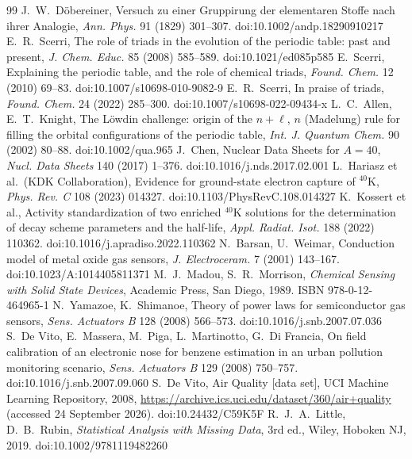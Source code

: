 \documentclass[11pt]{article}
\theoremstyle{definition}\newtheorem{definition}[theorem]{Definition}
\theoremstyle{remark}\newtheorem{remark}[theorem]{Remark}
\begin{document}
\begin{thebibliography}{99}\small
{} J.~W.~D\"obereiner, Versuch zu einer Gruppirung der elementaren Stoffe nach ihrer Analogie, \emph{Ann. Phys.} 91 (1829) 301--307. doi:10.1002/andp.18290910217
 E.~R.~Scerri, The role of triads in the evolution of the periodic table: past and present, \emph{J. Chem. Educ.} 85 (2008) 585--589. doi:10.1021/ed085p585
 E.~Scerri, Explaining the periodic table, and the role of chemical triads, \emph{Found. Chem.} 12 (2010) 69--83. doi:10.1007/s10698-010-9082-9
 E.~R.~Scerri, In praise of triads, \emph{Found. Chem.} 24 (2022) 285--300. doi:10.1007/s10698-022-09434-x
 L.~C.~Allen, E.~T.~Knight, The L\"owdin challenge: origin of the $n+\ell$, $n$ (Madelung) rule for filling the orbital configurations of the periodic table, \emph{Int. J. Quantum Chem.} 90 (2002) 80--88. doi:10.1002/qua.965
 J.~Chen, Nuclear Data Sheets for $A=40$, \emph{Nucl. Data Sheets} 140 (2017) 1--376. doi:10.1016/j.nds.2017.02.001
 L.~Hariasz et al.\ (KDK Collaboration), Evidence for ground-state electron capture of ${}^{40}$K, \emph{Phys. Rev. C} 108 (2023) 014327. doi:10.1103/PhysRevC.108.014327
 K.~Kossert et al., Activity standardization of two enriched ${}^{40}$K solutions for the determination of decay scheme parameters and the half-life, \emph{Appl. Radiat. Isot.} 188 (2022) 110362. doi:10.1016/j.apradiso.2022.110362
 N.~Barsan, U.~Weimar, Conduction model of metal oxide gas sensors, \emph{J. Electroceram.} 7 (2001) 143--167. doi:10.1023/A:1014405811371
 M.~J.~Madou, S.~R.~Morrison, \emph{Chemical Sensing with Solid State Devices}, Academic Press, San Diego, 1989. ISBN 978-0-12-464965-1
 N.~Yamazoe, K.~Shimanoe, Theory of power laws for semiconductor gas sensors, \emph{Sens. Actuators B} 128 (2008) 566--573. doi:10.1016/j.snb.2007.07.036
 S.~De Vito, E.~Massera, M.~Piga, L.~Martinotto, G.~Di Francia, On field calibration of an electronic nose for benzene estimation in an urban pollution monitoring scenario, \emph{Sens. Actuators B} 129 (2008) 750--757. doi:10.1016/j.snb.2007.09.060
 S.~De Vito, Air Quality [data set], UCI Machine Learning Repository, 2008, \url{https://archive.ics.uci.edu/dataset/360/air+quality} (accessed 24 September 2026). doi:10.24432/C59K5F
 R.~J.~A.~Little, D.~B.~Rubin, \emph{Statistical Analysis with Missing Data}, 3rd ed., Wiley, Hoboken NJ, 2019. doi:10.1002/9781119482260

\end{thebibliography}
\end{document}
